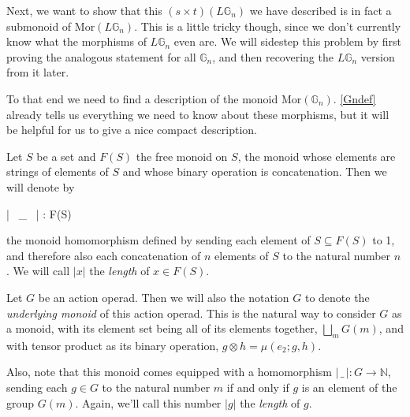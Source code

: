 Next, we want to show that this $(s \times t)(L\mathbb{G}_n)$ we have described is in fact a submonoid of $\mathrm{Mor}(L\mathbb{G}_n)$. This is a little tricky though, since we don't currently know what the morphisms of $L\mathbb{G}_n$ even are. We will sidestep this problem by first proving the analogous statement for all $\mathbb{G}_n$, and then recovering the $L\mathbb{G}_n$ version from it later.

To that end we need to find a description of the monoid $\mathrm{Mor}(\mathbb{G}_n)$. \cref{Gndef} already tells us everything we need to know about these morphisms, but it will be helpful for us to give a nice compact description.

\begin{defn}\label{lengthdef} Let $S$ be a set and $F(S)$ the free monoid on $S$, the monoid whose elements are strings of elements of $S$ and whose binary operation is concatenation. Then we will denote by
\begin{eq*} | \, \_ \, | : F(S) \to {} \end{eq*}
the monoid homomorphism defined by sending each element of $S \subseteq F(S)$ to 1, and therefore also each concatenation of $n$ elements of $S$ to the natural number $n$. We will call $|x|$ the \emph{length} of $x \in F(S)$.
\end{defn}

\begin{defn} Let $G$ be an action operad. Then we will also the notation $G$ to denote the \emph{underlying monoid} of this action operad. This is the natural way to consider $G$ as a monoid, with its element set being all of its elements together, $\bigsqcup_m G(m)$, and with tensor product as its binary operation, $g \otimes h = \mu(e_2; g, h)$.

Also, note that this monoid comes equipped with a homomorphism $| \, \_ \, | : G \to \mathbb{N}$, sending each $g \in G$ to the natural number $m$ if and only if $g$ is an element of the group $G(m)$. Again, we'll call this number $|g|$ the \emph{length} of $g$.
\end{defn}

